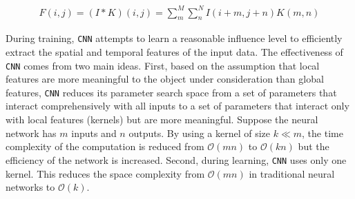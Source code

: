 \begin{align}
    F(i,j) = (I*K)(i,j) = \sum_m^M\sum_n^N{I(i+m, j+n)K(m,n)}
\end{align}


During training, \verb|CNN| attempts to learn a reasonable influence level to efficiently extract the spatial and temporal features of the input data. The effectiveness of \verb|CNN| comes from two main ideas. First, based on the assumption that local features are more meaningful to the object under consideration than global features, \verb|CNN| reduces its parameter search space from a set of parameters that interact comprehensively with all inputs to a set of parameters that interact only with local features (kernels) but are more meaningful. Suppose the neural network has $m$ inputs and $n$ outputs. By using a kernel of size $k\ll m$, the time complexity of the computation is reduced from $\mathcal{O}(mn)$ to $\mathcal{O}(kn)$ but the efficiency of the network is increased. Second, during learning, \verb|CNN| uses only one kernel. This reduces the space complexity from $\mathcal{O}(mn)$ in traditional neural networks to $\mathcal{O}(k)$.



